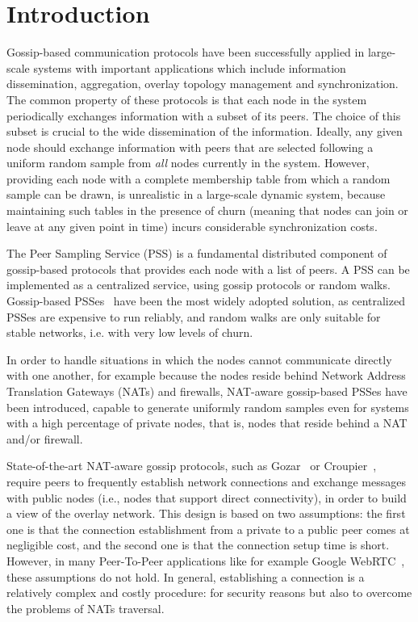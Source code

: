 
\chapter*{Introduction} %
\label{sommario}

Gossip-based communication protocols have been successfully applied in large-scale systems with important applications which include information dissemination, aggregation, overlay topology management and synchronization. The common property of these protocols is that each node in the system periodically exchanges information with a subset of its peers. The choice of this subset is crucial to the wide dissemination of the information. Ideally, any given node should exchange information with peers that are selected following a uniform random sample from \textit{all} nodes currently in the system. However, providing each node with a complete membership table from which a random sample can be drawn, is unrealistic in a large-scale dynamic system, because maintaining such tables in the presence of churn (meaning that nodes can join or leave at any given point in time) incurs considerable synchronization costs. 

The Peer Sampling Service (PSS) is a fundamental distributed component of gossip-based protocols that provides each node with a list of peers. A PSS can be implemented as a centralized service, using gossip protocols or random walks. Gossip-based PSSes~\cite{gossip_protocol} have been the most widely adopted solution, as centralized PSSes are expensive to run reliably, and random walks are only suitable for stable networks, i.e. with very low levels of churn. 

In order to handle situations in which the nodes cannot communicate directly with one another, for example because the nodes reside behind Network Address Translation Gateways (NATs) and firewalls, NAT-aware gossip-based PSSes have been introduced, capable to generate uniformly random samples even for systems with a high percentage of private nodes, that is, nodes that reside behind a NAT and/or firewall. 

State-of-the-art NAT-aware gossip protocols, such as Gozar~\cite{gozar} or Croupier~\cite{croupier}, require peers to frequently establish network connections and exchange messages with public nodes (i.e., nodes that support direct connectivity), in order to build a view of the overlay network. This design is based on two assumptions: the first one is that the connection establishment from a private to a public peer comes at negligible cost, and the second one is that the connection setup time is short. However, in many Peer-To-Peer applications like for example Google WebRTC~\cite{webrtc}, these assumptions do not hold. In general, establishing a connection is a relatively complex and costly procedure: for security reasons but also to overcome the problems of NATs traversal. 

